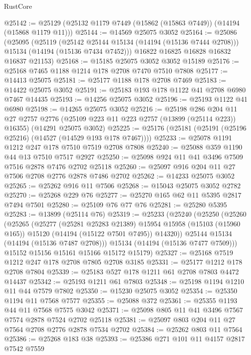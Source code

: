 \begin{lexlean}{RustCore}
\begin{coremodule}
@25142 := @25129 (@25132 @1179 @7449 (@15862 (@15863 @7449)) (@14194 (@15868 @1179 @11)))
@25144 := @14569 @25075 @3052
@25164 := @25086
    (@25095
      (@25119
        (@25142 @25144 @15134 (@14194 (@15136 @7444 @2708)))
        @15134
        (@14194 (@15136 @7434 @7452)))
      @16822
      @16825
      @16828
      @16832
      @16837
      @21153)
@25168 := @15185 @25075 @3052 @3052 @15189
@25176 := @25168 @7465 @1188 @1214 @178 @2708 @7470 @7510 @7808
@25177 := @14413 @25075
@25181 := @25177 @1188 @178 @2708 @7469
@25183 := @14422 @25075 @3052
@25191 := @25183 @193 @178 @1122 @41 @2708 @6980 @7467 @14435
@25193 := @14256 @25075 @3052
@25196 := @25193 @1122 @41 @6980
@25198 := @14265 @25075 @3052
@25216 := @25198
    @286
    @204
    @11
    @27
    @2757
    @2776
    (@25109 @223 @11 @223 @2757 (@13899 (@25114 @223)) @16355)
    (@14291 @25075 @3052)
@25225 := @25176 (@25181 (@25191 (@25196 @25216) (@14527 (@14529 @193 @178 @7467))))
@25233 := @25078 @1191 @1212 @247 @178 @7510 @7519 @2708 @7808
@25240 := @25088 @359 @1190 @44 @13 @7510 @7517 @2927
@25250 := @25098 @924 @11 @41 @3496 @7509 @7516 @2878 @7476 @2702 @25118
@25260 := @25097 @916 @204 @11 @27 @7506 @2708 @2776 @2878 @7486 @2702
@25262 := @14233 @25075 @3052
@25265 := @25262 @916 @11 @7506
@25268 := @15043 @25075 @3052 @2782
@25270 := @25268 @229 @76
@25277 := @25270 @165 @62 @11 @5395 @2817 @7494 @7501
@25280 := @25109 @76 @77 @76
@25281 := @25280 @5395
@25283 := @13899 (@25114 @76)
@25319 := @25233
    (@25240
      (@25250
        (@25260
          (@25265
            (@25277
              (@25281 @25283 @21389)
              @15954
              @15958
              (@15103 (@15960 @165))
              @15120
              (@14194 (@15122 @7501 @7495))
              @14320))
          @25144
          @15134
          (@14194 (@15136 @7487 @2708)))
        @15134
        (@14194 (@15136 @7477 @7509)))
      @15152
      @15156
      @15161
      @15166
      @15172
      @15179)
@25327 := @25168 @7519 @1212 @247 @178 @2708 @7805 @2708 @3185
@25331 := @25177 @1212 @178 @2708 @7804
@25339 := @25183 @527 @178 @1211 @61 @2708 @7803 @4472 @14437
@25342 := @25193 @1211 @61 @7803
@25348 := @25198 @1194 @1210 @11 @44 @7579 @7802
@25350 := @15230 @25075 @3052
@25354 := @25350 @1194 @11 @7568 @7577
@25355 := @25088 @372
@25361 := @25355 @1193 @44 @11 @7568 @7575 @3042
@25371 := @25098 @805 @11 @41 @3496 @7567 @7574 @2878 @7524 @2702 @25118
@25381 := @25097 @803 @204 @11 @27 @7564 @2708 @2776 @2878 @7534 @2702
@25384 := @25262 @803 @11 @7564
@25386 := @25268 @183 @38
@25393 := @25386 @271 @101 @11 @4157 @2817 @7542 @7559

\end{coremodule}
\end{lexlean}
